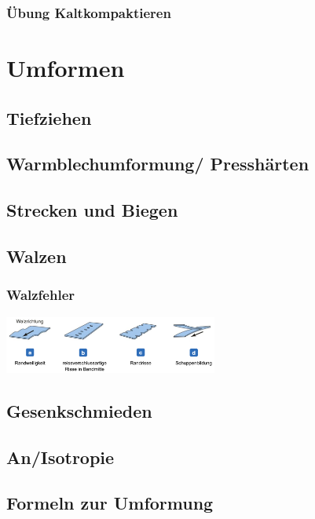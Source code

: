 \documentclass[12pt]{cheatsheet}
\begin{document}
    \subsubsection*{Übung Kaltkompaktieren}
    

\section*{Umformen}
    
    \vfill \null \columnbreak
    \subsection*{Tiefziehen}
    
    \subsection*{Warmblechumformung/ Presshärten}
    
    \subsection*{Strecken und Biegen}
    
    \subsection*{Walzen}
    
    \subsubsection*{Walzfehler}
    \includegraphics[width = 70mm]{src/images/Walzfehler.png}\\
    \subsection*{Gesenkschmieden}
    
    \subsection*{An/Isotropie}
    
    \subsection*{Formeln zur Umformung}
    
\end{document}
